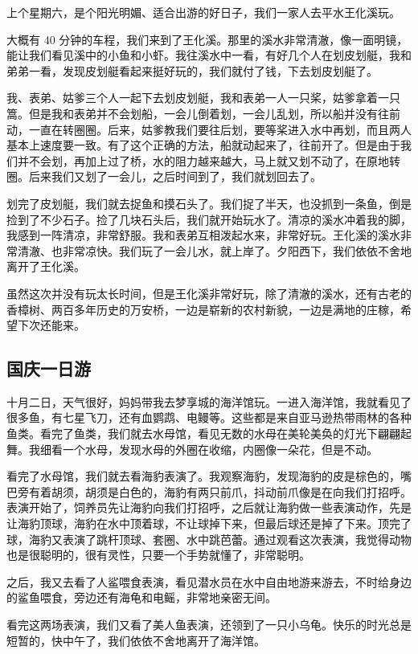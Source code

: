 \documentclass[UTF8,a4paper,titlepage,twoside,10.5pt]{article}
\begin{document}
上个星期六，是个阳光明媚、适合出游的好日子，我们一家人去平水王化溪玩。

大概有 40 分钟的车程，我们来到了王化溪。那里的溪水非常清澈，像一面明镜，能让我们看见溪中的小鱼和小虾。我往溪水中一看，有好几个人在划皮划艇，我和弟弟一看，发现皮划艇看起来挺好玩的，我们就付了钱，下去划皮划艇了。

我、表弟、姑爹三个人一起下去划皮划艇，我和表弟一人一只桨，姑爹拿着一只篙。但是我和表弟并不会划船，一会儿倒着划，一会儿乱划，所以船并没有往前动，一直在转圈圈。后来，姑爹教我们要往后划，要等桨进入水中再划，而且两人基本上速度要一致。有了这个正确的方法，船就动起来了，往前开了。但是由于我们并不会划，再加上过了桥，水的阻力越来越大，马上就又划不动了，在原地转圈。后来我们又划了一会儿，之后时间到了，我们就划回去了。

划完了皮划艇，我们就去捉鱼和摸石头了。我们捉了半天，也没抓到一条鱼，倒是捡到了不少石子。捡了几块石头后，我们就开始玩水了。清凉的溪水冲着我的脚，我感到一阵清凉，非常舒服。我和表弟互相泼起水来，非常好玩。王化溪的溪水非常清澈、也非常凉快。我们玩了一会儿水，就上岸了。夕阳西下，我们依依不舍地离开了王化溪。

虽然这次并没有玩太长时间，但是王化溪非常好玩，除了清澈的溪水，还有古老的香樟树、两百多年历史的万安桥，一边是崭新的农村新貌，一边是满地的庄稼，希望下次还能来。

\subsection{国庆一日游}
\label{sec:orgcdc4143}

十月二日，天气很好，妈妈带我去梦享城的海洋馆玩。一进入海洋馆，我就看见了很多鱼，有七星飞刀，还有血鹦鹉、电鳗等。这些都是来自亚马逊热带雨林的各种鱼类。看完了鱼类，我们就去水母馆，看见无数的水母在美轮美奂的灯光下翩翩起舞。我细看一个水母，发现水母的外圈在收缩，内圈像一朵花，但是不动。

看完了水母馆，我们就去看海豹表演了。我观察海豹，发现海豹的皮是棕色的，嘴巴旁有着胡须，胡须是白色的，海豹有两只前爪，抖动前爪像是在向我们打招呼。表演开始了，饲养员先让海豹向我们打招呼，之后就让海豹做一些表演动作，先是让海豹顶球，海豹在水中顶着球，不让球掉下来，但最后球还是掉了下来。顶完了球，海豹又表演了跳杆顶球、套圈、水中跳芭蕾。通过观看这次表演，我觉得动物也是很聪明的，很有灵性，只要一个手势就懂了，非常聪明。

之后，我又去看了人鲨喂食表演，看见潜水员在水中自由地游来游去，不时给身边的鲨鱼喂食，旁边还有海龟和电鳐，非常地亲密无间。

看完这两场表演，我们又看了美人鱼表演，还领到了一只小乌龟。快乐的时光总是短暂的，快中午了，我们依依不舍地离开了海洋馆。
\end{document}
